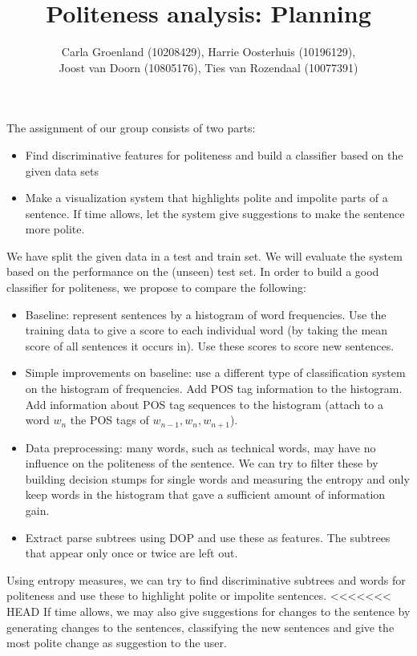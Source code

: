 \documentclass[11pt, english]{article}
\title{Politeness analysis: Planning}
\author{Carla Groenland (10208429), Harrie Oosterhuis (10196129), \\
Joost van Doorn (10805176), Ties van Rozendaal (10077391)}
\begin{document}
\maketitle
\noindent The assignment of our group consists of two parts:
\begin{itemize}
\item Find discriminative features for politeness and build a classifier based on the given data sets
\item Make a visualization system that highlights polite and impolite parts of a sentence. If time allows, let the system give suggestions to make the sentence more polite.
\end{itemize}
We have split the given data in a test and train set. We will evaluate the system based on the performance on the (unseen) test set.
In order to build a good classifier for politeness, we propose to compare the following:
\begin{itemize}
\item Baseline: represent sentences by a histogram of word frequencies. Use the training data to give a score to each individual word (by taking the mean score of all sentences it occurs in). Use these scores to score new sentences. 
\item Simple improvements on baseline: use a different type of classification system on the histogram of frequencies. Add POS tag information to the histogram. Add information about POS tag sequences to the histogram (attach to a word $w_n$ the POS tags of $w_{n-1},w_n,w_{n+1}$).
\item Data preprocessing: many words, such as technical words, may have no influence on the politeness of the sentence. We can try to filter these by building decision stumps for single words and measuring the entropy and only keep words in the histogram that gave a sufficient amount of information gain.
\item Extract parse subtrees using DOP and use these as features. The subtrees that appear only once or twice are left out. 
\end{itemize}
Using entropy measures, we can try to find discriminative subtrees and words for politeness and use these to highlight polite or impolite sentences. 
<<<<<<< HEAD
If time allows, we may also give suggestions for changes to the sentence by generating changes to the sentences, classifying the new sentences and give the most polite change as suggestion to the user.\\
\end{document}
